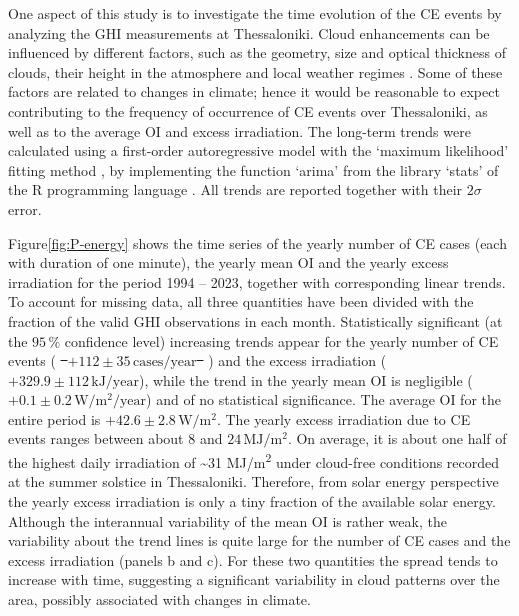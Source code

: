 \documentclass[preprint, 5p,
authoryear]{elsarticle} %
\providecommand{\DIFaddtex}[1]{{\protect\color{blue}\uwave{#1}}} %
\providecommand{\DIFdeltex}[1]{{\protect\color{red}\sout{#1}}}                      %
\providecommand{\DIFaddbegin}{} %
\providecommand{\DIFaddend}{} %
\providecommand{\DIFdelbegin}{} %
\providecommand{\DIFdelend}{} %
\providecommand{\DIFadd}[1]{\texorpdfstring{\DIFaddtex{#1}}{#1}} %
\providecommand{\DIFdel}[1]{\texorpdfstring{\DIFdeltex{#1}}{}} %
\newcommand{\DIFscaledelfig}{0.5}
\newlength{\DIFdelgraphicswidth} %
\newlength{\DIFdelgraphicsheight} %
\newcommand{\DIFaddincludegraphics}[2][]{{\color{blue}\fbox{\DIFOincludegraphics[#1]{#2}}}} %
\newcommand{\DIFdelincludegraphics}[2][]{%
\sbox{\DIFdelgraphicsbox}{\DIFOincludegraphics[#1]{#2}}%
\settoboxwidth{\DIFdelgraphicswidth}{\DIFdelgraphicsbox} %
\settoboxtotalheight{\DIFdelgraphicsheight}{\DIFdelgraphicsbox} %
\scalebox{\DIFscaledelfig}{%
\parbox[b]{\DIFdelgraphicswidth}{\usebox{\DIFdelgraphicsbox}\\[-\baselineskip] \rule{\DIFdelgraphicswidth}{0em}}\llap{\resizebox{\DIFdelgraphicswidth}{\DIFdelgraphicsheight}{%
\setlength{\unitlength}{\DIFdelgraphicswidth}%
\begin{picture}(1,1)%
\thicklines\linethickness{2pt} %
{\color[rgb]{1,0,0}\put(0,0){\framebox(1,1){}}}%
{\color[rgb]{1,0,0}\put(0,0){\line( 1,1){1}}}%
{\color[rgb]{1,0,0}\put(0,1){\line(1,-1){1}}}%
\end{picture}%
}\hspace*{3pt}}} %
} %
\DeclareRobustCommand{\DIFaddbegin}{\DIFOaddbegin \let\includegraphics\DIFaddincludegraphics} %
\DeclareRobustCommand{\DIFaddend}{\DIFOaddend \let\includegraphics\DIFOincludegraphics} %
\DeclareRobustCommand{\DIFdelbegin}{\DIFOdelbegin \let\includegraphics\DIFdelincludegraphics} %
\DeclareRobustCommand{\DIFdelend}{\DIFOaddend \let\includegraphics\DIFOincludegraphics} %
\begin{document}
One aspect of this study is to investigate the time evolution of the CE
events by analyzing the GHI measurements at Thessaloniki. Cloud
enhancements can be influenced by different factors, such as the
geometry, size and optical thickness of clouds, their height in the
atmosphere and local weather regimes
\citep{Mol2023, Veerman2022, Gristey2022, Tzoumanikas2016}. Some of
these factors are related to changes in climate; hence it would be
reasonable to expect contributing to the frequency of occurrence of CE
events over Thessaloniki, as well as to the average OI and excess
irradiation. The long-term trends were calculated using a first-order
autoregressive model with the `maximum likelihood' fitting method
\citep{Gardner1980, Jones1980}, by implementing the function `arima'
from the library `stats' of the R programming language \citep{RCT2023}.
All trends are reported together with their \(2\sigma\) error.

Figure\nobreakspace{}\ref{fig:P-energy} shows the time series of the
yearly number of CE cases (each with duration of one minute), the yearly
mean OI and the yearly excess irradiation for the period 1994 -- 2023,
together with corresponding linear trends. To account for missing data,
all three quantities have been divided with the fraction of the valid
GHI observations in each month. Statistically significant (at the
\(95\,\%\) confidence level) increasing trends appear for the yearly
number of CE events (\DIFdelbegin \DIFdel{%
\mbox{%
\(+112\pm 35\,\text{cases}/\text{year}\)
}%
}\DIFdelend \DIFaddbegin \DIFadd{%
\mbox{%
\(+113\pm 35\,\text{cases}/\text{year}\)
}%
}\DIFaddend ) and the
excess irradiation (\DIFdelbegin \DIFdel{\(+329.9 \pm 112\,\text{kJ}/\text{year}\)}\DIFdelend \DIFaddbegin \DIFadd{\(+336.2\pm 114.1\,\text{kJ}/\text{year}\)}\DIFaddend ), while
the trend in the yearly mean OI is negligible
(\(+0.1\pm 0.2\,\text{W}/\text{m}^2/\text{year}\)) and of no statistical
significance. The average OI for the entire period is
\DIFdelbegin \DIFdel{\(+42.6\pm 2.8\,\text{W}/\text{m}^2\)}\DIFdelend \DIFaddbegin \DIFadd{\(+42.7\pm 2.8\,\text{W}/\text{m}^2\)}\DIFaddend . The yearly excess irradiation due
to CE events ranges between about \(8\) and
\(24\,\text{MJ}/\text{m}^2\). On average, it is about one half of the
highest daily irradiation of \textasciitilde31 MJ/m\textsuperscript{2}
under cloud-free conditions recorded at the summer solstice in
Thessaloniki. Therefore, from solar energy perspective the yearly excess
irradiation is only a tiny fraction of the available solar energy.
Although the interannual variability of the mean OI is rather weak, the
variability about the trend lines is quite large for the number of CE
cases and the excess irradiation (panels b and c). For these two
quantities the spread tends to increase with time, suggesting a
significant variability in cloud patterns over the area, possibly
associated with changes in climate.
\end{document}
